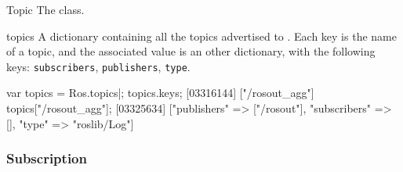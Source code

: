 \begin{urbiscriptapi}
\item[Topic]%
  The  class.


\item[topics]%
  A dictionary containing all the topics advertised to
  . Each key is the name of a topic, and the associated
  value is an other dictionary, with the following keys:
  \lstinline{subscribers}, \lstinline{publishers}, \lstinline{type}.
\begin{urbiscript}
var topics = Ros.topics|;
topics.keys;
[03316144] ["/rosout_agg"]
topics["/rosout_agg"];
[03325634] ["publishers" => ["/rosout"], "subscribers" => [], "type" => "roslib/Log"]
\end{urbiscript}
\end{urbiscriptapi}


\subsubsection{Subscription}

